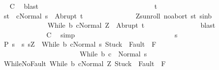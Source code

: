 \begin{isabellebody}
\ \isamarkupfalse%
\ {\isacharquery}C{}\ \isamarkupfalse%
\ blast\isanewline
\ \ \ \ \ \ \ \ \isamarkupfalse%
\isanewline
\ \ \ \ \ \ \ \ \ \ \isacommand{{\isacharbraceleft}}\isamarkupfalse%
\isanewline
\ \ \ \ \ \ \ \ \ \ \ \ \isamarkupfalse%
\ t\isanewline
\ \ \ \ \ \ \ \ \ \ \ \ \isamarkupfalse%
\ s{\isacharunderscore}t{\isacharcolon}\ \ {\isachardoublequoteopen}{\isasymGamma}{\isasymturnstile}{\isasymlangle}c{\isacharcomma}Normal\ s{\isasymrangle}\ {\isasymRightarrow}\ Abrupt\ t{\isachardoublequoteclose}\ \isanewline
\ \ \ \ \ \ \ \ \ \ \ \ \isamarkupfalse%
\ Z{\isacharunderscore}s{\isacharunderscore}unroll\ noabort\ s{\isacharunderscore}t\ s{\isacharunderscore}in{\isacharunderscore}b\isanewline
\ \ \ \ \ \ \ \ \ \ \ \ \isamarkupfalse%
\ {\isachardoublequoteopen}{\isasymGamma}{\isasymturnstile}{\isasymlangle}While\ b\ c{\isacharcomma}Normal\ Z{\isasymrangle}\ {\isasymRightarrow}\ Abrupt\ t{\isachardoublequoteclose}\isanewline
\ \ \ \ \ \ \ \ \ \ \ \ \ \ \isamarkupfalse%
\ blast\isanewline
\ \ \ \ \ \ \ \ \ \ \isacommand{{\isacharbraceright}}\isamarkupfalse%
\ \isamarkupfalse%
\ {\isacharquery}C{}\ \isamarkupfalse%
\ simp\isanewline
\ \ \ \ \ \ \ \ \isamarkupfalse%
\isanewline
\ \ \ \ \ \ \isamarkupfalse%
\isanewline
\ \ \ \ \isamarkupfalse%
\isanewline
\ \ \isamarkupfalse%
\isanewline
\ \ \ \ \isamarkupfalse%
\ s\isanewline
\ \ \ \ \isamarkupfalse%
\ P{\isacharcolon}\ {\isachardoublequoteopen}s\ {\isasymin}\ {\isacharbraceleft}s{\isachardot}\ s{\isacharequal}Z\ {\isasymand}\ {\isasymGamma}{\isasymturnstile}{\isasymlangle}While\ b\ c{\isacharcomma}Normal\ s{\isasymrangle}\ {\isasymRightarrow}{\isasymnotin}{\isacharparenleft}{\isacharbraceleft}Stuck{\isacharbraceright}\ {\isasymunion}\ Fault\ {\isacharbackquote}\ {\isacharparenleft}{\isacharminus}F{\isacharparenright}{\isacharparenright}\ {\isasymand}\ \isanewline
\ \ \ \ \ \ \ \ \ \ \ \ \ \ \ \ \ \ \ \ \ \ \ {\isasymGamma}{\isasymturnstile}While\ b\ c\ {\isasymdown}\ Normal\ s{\isacharbraceright}{\isachardoublequoteclose}\isanewline
\ \ \ \ \isamarkupfalse%
\ WhileNoFault{\isacharcolon}\ {\isachardoublequoteopen}{\isasymGamma}{\isasymturnstile}{\isasymlangle}While\ b\ c{\isacharcomma}Normal\ Z{\isasymrangle}\ {\isasymRightarrow}{\isasymnotin}{\isacharparenleft}{\isacharbraceleft}Stuck{\isacharbraceright}\ {\isasymunion}\ Fault\ {\isacharbackquote}\ {\isacharparenleft}{\isacharminus}F{\isacharparenright}{\isacharparenright}{\isachardoublequoteclose}\isanewline

\end{isabellebody}
